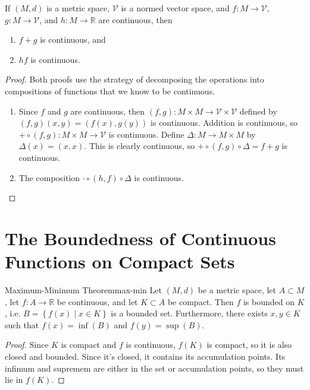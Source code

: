 \documentclass[10pt]{report}
\begin{document}
\begin{cor}
	If $(M,d)$ is a metric space, $\mathcal{V}$ is a normed vector space, and $f:M\to \mathcal{V}$, $g:M\to \mathcal{V}$, and $h:M \to \mathbb{R}$ are continuous, then
	\begin{enumerate}
		\item $f+g$ is continuous, and
		\item $hf$ is continuous.
	\end{enumerate}
\end{cor}
\begin{proof}
	Both proofs use the strategy of decomposing the operations into compositions of functions that we know to be continuous.
	\begin{enumerate}
		\item Since $f$ and $g$ are continuous, then $(f,g):M\times M \to \mathcal{V} \times \mathcal{V}$ defined by $(f,g)(x,y) = (f(x), g(y))$ is continuous. Addition is continuous, so $+ \circ (f,g): M\times M \to \mathcal{V}$ is continuous. Define $\Delta:M \to M\times M$ by $\Delta(x) = (x,x)$. This is clearly continuous, so $+ \circ (f,g) \circ \Delta = f+g$  is continuous.
		\item The composition $\cdot \circ (h,f) \circ \Delta$ is continuous.
	\end{enumerate}
\end{proof}


\section{The Boundedness of Continuous Functions on Compact Sets}

\begin{thrm}{Maximum-Minimum Theorem}{max-min}
	Let $(M,d)$ be a metric space, let $A \subset M$, let $f:A \to \mathbb{R}$ be continuous, and let $K \subset A$ be compact. Then $f$ is bounded on $K$, i.e. $B = \left\{ f(x) \;|\; x\in K \right\}$ is a bounded set. Furthermore, there exists $x, y \in K$ such that $f(x) = \inf(B)$ and $f(y) = \sup(B)$.
\end{thrm}
\begin{proof}
	Since $K$ is compact and $f$ is continuous, $f(K)$ is compact, so it is also closed and bounded. Since it's closed, it contains its accumulation points. Its infimum and supremem are either in the set or accumulation points, so they must lie in $f(K)$.
\end{proof}
\end{document}
